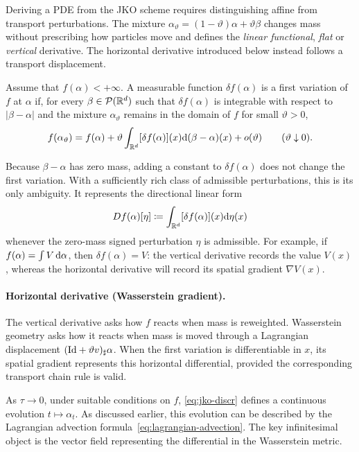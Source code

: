 Deriving a PDE from the JKO scheme requires distinguishing affine from transport perturbations. The mixture \(\alpha_\vartheta=(1-\vartheta)\alpha+\vartheta\beta\) changes mass without prescribing how particles move and defines the \emph{linear functional}, \emph{flat} or \emph{vertical} derivative. The horizontal derivative introduced below instead follows a transport displacement.
\begin{defn}\label{def-first-variation}
	Assume that \(f(\alpha)<+\infty\). A measurable function \(\delta f(\alpha)\) is a first variation of \(f\) at \(\alpha\) if, for every \(\beta\in\mathcal{P}(\mathbb{R}^d)\) such that \(\delta f(\alpha)\) is integrable with respect to \(\lvert\beta-\alpha\rvert\) and the mixture \(\alpha_\vartheta\) remains in the domain of \(f\) for small \(\vartheta>0\),
	\[
		f(\alpha_\vartheta)
		=
		f(\alpha)
		+\vartheta\int_{\mathbb{R}^d}[\delta f(\alpha)](x)
		\mathrm{d}(\beta-\alpha)(x)
		+o(\vartheta)
		\qquad(\vartheta\downarrow0).
	\]
\end{defn}
Because \(\beta-\alpha\) has zero mass, adding a constant to \(\delta f(\alpha)\) does not change the first variation. With a sufficiently rich class of admissible perturbations, this is its only ambiguity. It represents the directional linear form
\[
	Df(\alpha)[\eta]
	\coloneqq
	\int_{\mathbb{R}^d}[\delta f(\alpha)](x)\mathrm{d}\eta(x)
\]
whenever the zero-mass signed perturbation \(\eta\) is admissible. For example, if \(f(\alpha)=\int V\,\mathrm{d}\alpha\), then \(\delta f(\alpha)=V\): the vertical derivative records the value \(V(x)\), whereas the horizontal derivative will record its spatial gradient \(\nabla V(x)\).

\paragraph{Horizontal derivative (Wasserstein gradient).}

The vertical derivative asks how \(f\) reacts when mass is reweighted. Wasserstein geometry asks how it reacts when mass is moved through a Lagrangian displacement \((\mathrm{Id}+\vartheta v)_\sharp\alpha\). When the first variation is differentiable in \(x\), its spatial gradient represents this horizontal differential, provided the corresponding transport chain rule is valid.

As \(\tau\to0\), under suitable conditions on \(f\), \eqref{eq:jko-discr} defines a continuous evolution \(t\mapsto\alpha_t\). As discussed earlier, this evolution can be described by the Lagrangian advection formula~\eqref{eq:lagrangian-advection}. The key infinitesimal object is the vector field representing the differential in the Wasserstein metric.

